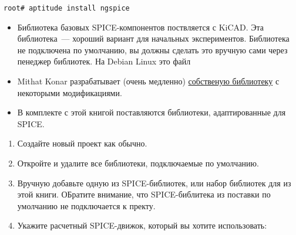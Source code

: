 





\begin{verbatim}
root# aptitude install ngspice
\end{verbatim}


\begin{itemize}
\item Библиотека базовых SPICE-компонентов поствляется с KiCAD. Эта
библиотека\ --- хороший вариант для начальных экспериментов.
Библиотека не подключена по умолчанию, вы должны сделать это вручную сами через
пенеджер библиотек. На Debian Linux это файл\\

\item Mithat Konar  разрабатывает (очень медленно)
\href{https://bitbucket.org/mithat/kicad-spice-library}{собственую
библиотеку} с некоторыми модификациями.

\item В комплекте с этой книгой поставляются библиотеки, адаптированные для
SPICE.

\end{itemize}


\begin{enumerate}
\item Создайте новый проект как обычно.
\item Откройте  и удалите все библиотеки, подключаемые по
умолчанию.
\item Вручную добавьте одную из SPICE-библиотек, или набор библиотек для
из этой книги. ОБратите внимание, что SPICE-библитека из поставки 
по умолчанию не подключается к пректу.
\item Укажите расчетный SPICE-движок, который вы хотите использовать:



\end{enumerate}

